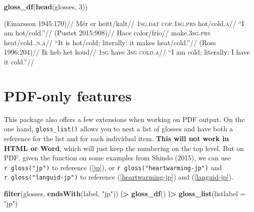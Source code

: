\documentclass[
]{article}
\newenvironment{Shaded}{\begin{snugshade}}{\end{snugshade}}
\newcommand{\AttributeTok}[1]{\textcolor[rgb]{0.13,0.29,0.53}{#1}}
\newcommand{\DecValTok}[1]{\textcolor[rgb]{0.00,0.00,0.81}{#1}}
\newcommand{\FunctionTok}[1]{\textcolor[rgb]{0.13,0.29,0.53}{\textbf{#1}}}
\newcommand{\NormalTok}[1]{#1}
\newcommand{\SpecialCharTok}[1]{\textcolor[rgb]{0.81,0.36,0.00}{\textbf{#1}}}
\newcommand{\StringTok}[1]{\textcolor[rgb]{0.31,0.60,0.02}{#1}}
\begin{document}
\begin{Shaded}
\begin{Highlighting}[]
\FunctionTok{gloss\_df}\NormalTok{(}\FunctionTok{head}\NormalTok{(glosses, }\DecValTok{3}\NormalTok{))}
\end{Highlighting}
\end{Shaded}

\ex\label{feel-icelandic} \begingl \glpreamble (Einarsson 1945:170)// \gla Mér er heitt/kalt// \glb \textsc{1sg.dat} \textsc{cop.1sg.prs} hot/cold.\textsc{a}// \glft ``I am hot/cold.''//
\endgl \xe 
\ex\label{amb-spanish} \begingl \glpreamble (Pustet 2015:908)// \gla Hace calor/frío// \glb make.\textsc{3sg.prs} heat/cold.\textsc{.n.a}// \glft ``It is hot/cold; literally: it makes heat/cold.''//
\endgl \xe 
\ex\label{feel-dutch} \begingl \glpreamble (Ross 1996:204)// \gla Ik heb het koud// \glb \textsc{1sg} have \textsc{3sg} \textsc{cold.a}// \glft ``I am cold; literally: I have it cold.''//
\endgl \xe 

\section{PDF-only features}\label{pdf-only-features}

This package also offers a few extensions when working on PDF output. On the one hand, \texttt{gloss\_list()} allows you to nest a list of glosses and have both a reference for the list and for each individual item. \textbf{This will not work in HTML or Word}, which will just keep the numbering on the top level. But on PDF, given the function on some examples from Shindo (2015), we can use \texttt{\textasciigrave{}r\ gloss("jp")\textasciigrave{}} to reference (\ref{jp}), or \texttt{\textasciigrave{}r\ gloss("heartwarming-jp")\textasciigrave{}} and \texttt{\textasciigrave{}r\ gloss("languid-jp")\textasciigrave{}} to reference (\ref{heartwarming-jp}) and (\ref{languid-jp}).

\begin{Shaded}
\begin{Highlighting}[]
\FunctionTok{filter}\NormalTok{(glosses, }\FunctionTok{endsWith}\NormalTok{(label, }\StringTok{"jp"}\NormalTok{)) }\SpecialCharTok{|\textgreater{}} 
  \FunctionTok{gloss\_df}\NormalTok{() }\SpecialCharTok{|\textgreater{}} 
  \FunctionTok{gloss\_list}\NormalTok{(}\AttributeTok{listlabel =} \StringTok{"jp"}\NormalTok{)}
\end{Highlighting}
\end{Shaded}
\end{document}
